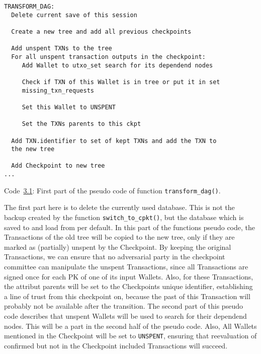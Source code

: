 \begin{center}
\label{pseudo_transform_dag_1} \small \samepage
\begin{verbatim}
TRANSFORM_DAG:   
  Delete current save of this session

  Create a new tree and add all previous checkpoints

  Add unspent TXNs to the tree
  For all unspent transaction outputs in the checkpoint:
     Add Wallet to utxo_set search for its dependend nodes

     Check if TXN of this Wallet is in tree or put it in set 
     missing_txn_requests
     
     Set this Wallet to UNSPENT

     Set the TXNs parents to this ckpt

  Add TXN.identifier to set of kept TXNs and add the TXN to 
  the new tree

  Add Checkpoint to new tree
...
\end{verbatim}	
\vspace{2mm}	
\footnotesize{Code~\hyperref[pseudo_transform_dag_1]{3.1}: First part of the pseudo code of function \texttt{transform\_dag()}.}
\end{center}

The first part here is to delete the currently used database. This is not the backup created by the function \texttt{switch\_to\_cpkt()}, but the database which is saved to and load from per default.
In this part of the functions pseudo code, the Transactions of the old tree will be copied to the new tree, only if they are marked as (partially) unspent by the Checkpoint. By keeping the original Transactions, we can ensure that no adversarial party in the checkpoint committee can manipulate the unspent Transactions, since all Transactions are signed once for each PK of one of its input Wallets. Also, for these Transactions, the attribut parents will be set to the Checkpoints unique identifier, establishing a line of trust from this checkpoint on, because the past of this Transaction will probably not be available after the transition.
The second part of this pseudo code describes that unspent Wallets will be used to search for their dependend nodes. This will be a part in the second half of the pseudo code. Also, All Wallets mentioned in the Checkpoint will be set to \texttt{UNSPENT}, ensuring that reevaluation of confirmed but not in the Checkpoint included Transactions will succeed.

